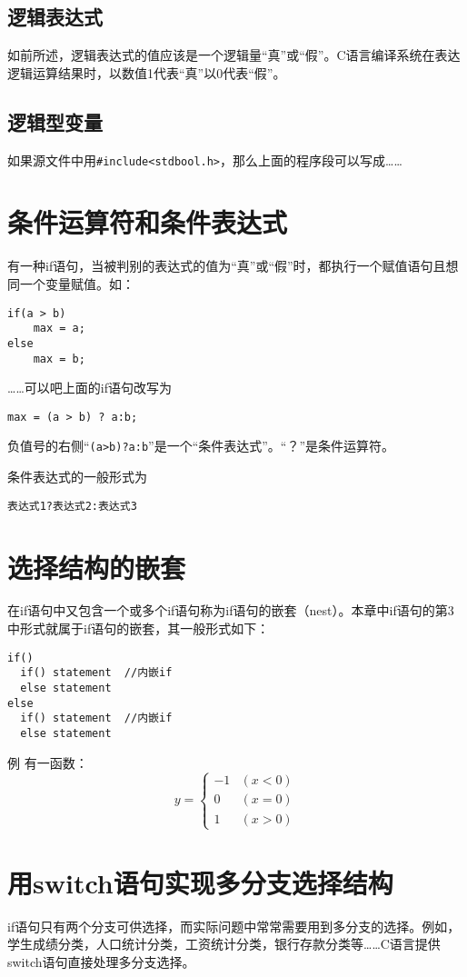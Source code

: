 \subsection{逻辑表达式}
如前所述，逻辑表达式的值应该是一个逻辑量“真”或“假”。C语言编译系统在表达逻辑运算结果时，以数值1代表“真”以0代表“假”。
\subsection{逻辑型变量}
如果源文件中用\verb|#include<stdbool.h>|，那么上面的程序段可以写成……
\section{条件运算符和条件表达式}
有一种if语句，当被判别的表达式的值为“真”或“假”时，都执行一个赋值语句且想同一个变量赋值。如：
\begin{lstlisting}
if(a > b)
	max = a;
else
	max = b;
\end{lstlisting}
……可以吧上面的if语句改写为
\begin{lstlisting}
max = (a > b) ? a:b;
\end{lstlisting}
负值号的右侧“\verb|(a>b)?a:b|”是一个“条件表达式”。“？”是条件运算符。

条件表达式的一般形式为
\begin{lstlisting}
表达式1?表达式2:表达式3
\end{lstlisting}

\section{选择结构的嵌套}
在if语句中又包含一个或多个if语句称为if语句的嵌套（nest）。本章中if语句的第3中形式就属于if语句的嵌套，其一般形式如下：
\begin{lstlisting}
if()
  if() statement  //内嵌if
  else statement
else
  if() statement  //内嵌if
  else statement
\end{lstlisting}
例 有一函数：
\begin{equation} y = 
	\begin{cases}
		-1 & (x < 0) \\
		0 & (x = 0) \\
		1 & ( x > 0)
	\end{cases}
\end{equation}
\section{用switch语句实现多分支选择结构}
if语句只有两个分支可供选择，而实际问题中常常需要用到多分支的选择。例如，学生成绩分类，人口统计分类，工资统计分类，银行存款分类等……C语言提供switch语句直接处理多分支选择。

